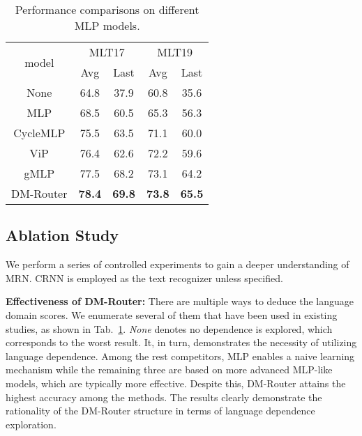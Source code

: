 \documentclass[10pt,twocolumn,letterpaper]{article}
\begin{document}
\begin{table}[h]
\begin{center}
\begin{tabular}{c|cc|cc}
\hline
\multirow{2}{*}{model} & \multicolumn{2}{c|}{MLT17}    & \multicolumn{2}{c}{MLT19}     \\ \cline{2-5} 
                       & Avg           & Last          & Avg           & Last          \\ \hline
None                   & 64.8          & 37.9          & 60.8          & 35.6          \\
MLP                 & 68.5          & 60.5          & 65.3          & 56.3          \\
CycleMLP\cite{chen2022cyclemlp}              & 75.5          & 63.5          & 71.1          & 60.0          \\
ViP\cite{hou2022vip}                    & 76.4          & 62.6          & 72.2          & 59.6          \\
gMLP\cite{liu2021gmlp}                   & 77.5          & 68.2          & 73.1          & 64.2          \\ \hline
DM-Router                   & \textbf{78.4} & \textbf{69.8} & \textbf{73.8} & \textbf{65.5} \\ \hline
\end{tabular}
\end{center}
\caption{
Performance comparisons on different MLP models.
}  
\label{table:mlp}
\end{table}


\subsection{Ablation Study}
We perform a series of controlled experiments to gain a deeper understanding of MRN. CRNN is employed as the text recognizer unless specified.

\noindent\textbf{Effectiveness of DM-Router:} There are multiple ways to deduce the language domain scores. We enumerate several of them that have been used in existing studies, as shown in Tab.~\ref{table:mlp}. \emph{None} denotes no dependence is explored, which corresponds to the worst result. It, in turn, demonstrates the necessity of utilizing language dependence. Among the rest competitors, MLP enables a naive learning mechanism while the remaining three are based on more advanced MLP-like models, which are typically more effective. Despite this, DM-Router attains the highest accuracy among the methods. The results clearly demonstrate the rationality of the DM-Router structure in terms of language dependence exploration.
\end{document}
